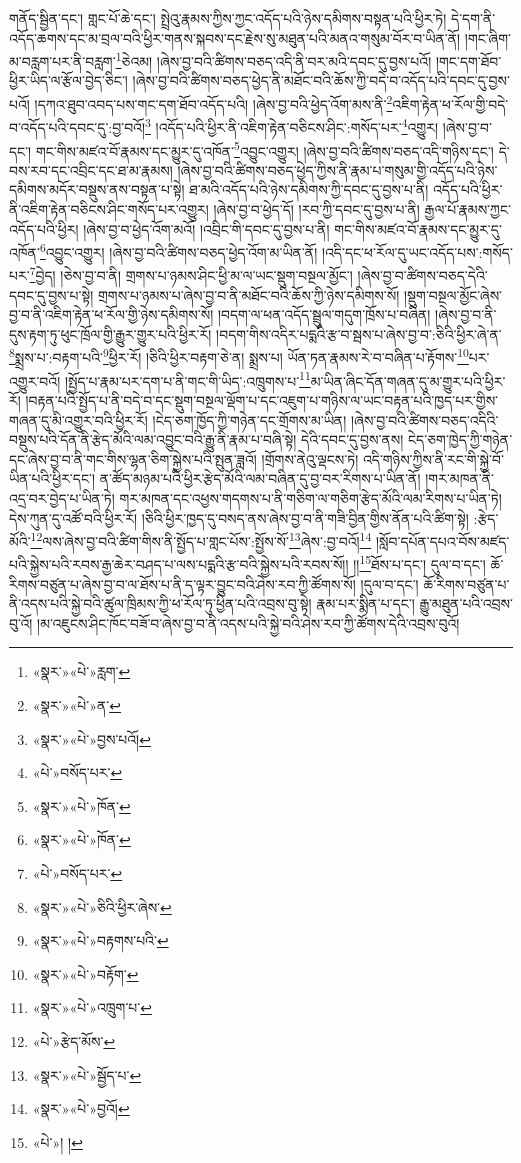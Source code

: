 གནོད་སྦྱིན་དང་། གླང་པོ་ཆེ་དང་། སྤྲེའུ་རྣམས་ཀྱིས་ཀྱང་འདོད་པའི་ཉེས་དམིགས་བསྟན་པའི་ཕྱིར་ཏེ། དེ་དག་ནི་འདོད་ཆགས་དང་མ་བྲལ་བའི་ཕྱིར་གནས་སྐབས་དང་རྗེས་སུ་མཐུན་པའི་མནའ་གསུམ་བོར་བ་ཡིན་ནོ། །གང་ཞིག་མ་བརླག་པར་ནི་བརླག་\footnote{«སྣར་»«པེ་»རླག་}ཅེའམ། །ཞེས་བྱ་བའི་ཚིགས་བཅད་འདི་ནི་བར་མའི་དབང་དུ་བྱས་པའོ། །གང་དག་ཐོབ་ཕྱིར་ཡིད་ལ་རྩོལ་བྱེད་ཅིང་། །ཞེས་བྱ་བའི་ཚིགས་བཅད་ཕྱེད་ནི་མཐོང་བའི་ཆོས་ཀྱི་བདེ་བ་འདོད་པའི་དབང་དུ་བྱས་པའོ། །དཀའ་ཐུབ་འབད་པས་གང་དག་ཐོབ་འདོད་པའི། །ཞེས་བྱ་བའི་ཕྱེད་འོག་མས་ནི་\footnote{«སྣར་»«པེ་»ན་}འཇིག་རྟེན་ཕ་རོལ་གྱི་བདེ་བ་འདོད་པའི་དབང་དུ་:བྱ་བའོ།\footnote{«སྣར་»«པེ་»བྱས་པའོ།} །འདོད་པའི་ཕྱིར་ནི་འཇིག་རྟེན་བཅིངས་ཤིང་:གསོད་པར་\footnote{«པེ་»བསོད་པར་}འགྱུར། །ཞེས་བྱ་བ་དང་། གང་གིས་མཛའ་བོ་རྣམས་དང་མྱུར་དུ་འཁོན་\footnote{«སྣར་»«པེ་»ཁོན་}འབྱུང་འགྱུར། །ཞེས་བྱ་བའི་ཚིགས་བཅད་འདི་གཉིས་དང་། དེ་བས་རབ་དང་འབྲིང་དང་ཐ་མ་རྣམས། །ཞེས་བྱ་བའི་ཚིགས་བཅད་ཕྱེད་ཀྱིས་ནི་རྣམ་པ་གསུམ་གྱི་འདོད་པའི་ཉེས་དམིགས་མདོར་བསྡུས་ནས་བསྟན་པ་སྟེ། ཐ་མའི་འདོད་པའི་ཉེས་དམིགས་ཀྱི་དབང་དུ་བྱས་པ་ནི། འདོད་པའི་ཕྱིར་ནི་འཇིག་རྟེན་བཅིངས་ཤིང་གསོད་པར་འགྱུར། །ཞེས་བྱ་བ་ཕྱེད་དོ། །རབ་ཀྱི་དབང་དུ་བྱས་པ་ནི། རྒྱལ་པོ་རྣམས་ཀྱང་འདོད་པའི་ཕྱིར། །ཞེས་བྱ་བ་ཕྱེད་འོག་མའོ། །འབྲིང་གི་དབང་དུ་བྱས་པ་ནི། གང་གིས་མཛའ་བོ་རྣམས་དང་མྱུར་དུ་འཁོན་\footnote{«སྣར་»«པེ་»ཁོན་}འབྱུང་འགྱུར། །ཞེས་བྱ་བའི་ཚིགས་བཅད་ཕྱེད་འོག་མ་ཡིན་ནོ། །འདི་དང་ཕ་རོལ་དུ་ཡང་འདོད་པས་:གསོད་པར་\footnote{«པེ་»བསོད་པར་}བྱེད། །ཅེས་བྱ་བ་ནི། གྲགས་པ་ཉམས་ཤིང་ཕྱི་མ་ལ་ཡང་སྡུག་བསྔལ་མྱོང་། །ཞེས་བྱ་བ་ཚིགས་བཅད་དེའི་དབང་དུ་བྱས་པ་སྟེ། གྲགས་པ་ཉམས་པ་ཞེས་བྱ་བ་ནི་མཐོང་བའི་ཆོས་ཀྱི་ཉེས་དམིགས་སོ། །སྡུག་བསྔལ་མྱོང་ཞེས་བྱ་བ་ནི་འཇིག་རྟེན་ཕ་རོལ་གྱི་ཉེས་དམིགས་སོ། །བདག་ལ་ཕན་འདོད་སྦྲུལ་གདུག་ཁྲོས་པ་བཞིན། །ཞེས་བྱ་བ་ནི་དུས་རྟག་ཏུ་ཕུང་ཁྲོལ་གྱི་རྒྱུར་གྱུར་པའི་ཕྱིར་རོ། །བདག་གིས་འདིར་པདྨའི་རྩ་བ་སྦས་པ་ཞེས་བྱ་བ་:ཅིའི་ཕྱིར་ཞེ་ན་\footnote{«སྣར་»«པེ་»ཅིའི་ཕྱིར་ཞེས་}སྨྲས་པ་:བརྟག་པའི་\footnote{«སྣར་»«པེ་»བརྟགས་པའི་}ཕྱིར་རོ། །ཅིའི་ཕྱིར་བརྟག་ཅེ་ན། སྨྲས་པ། ཡོན་ཏན་རྣམས་རེ་བ་བཞིན་པ་རྟོགས་\footnote{«སྣར་»«པེ་»བརྟོག་}པར་འགྱུར་བའོ། །སྤྱོད་པ་རྣམ་པར་དག་པ་ནི་གང་གི་ཡིད་:འཁྲུགས་པ་\footnote{«སྣར་»«པེ་»འཁྲུག་པ་}མ་ཡིན་ཞིང་དོན་གཞན་དུ་མ་གྱུར་པའི་ཕྱིར་རོ། །བརྟན་པའི་སྤྱོད་པ་ནི་བདེ་བ་དང་སྡུག་བསྔལ་ལྡོག་པ་དང་འཇུག་པ་གཉིས་ལ་ཡང་བརྟན་པའི་ཁྱད་པར་གྱིས་གཞན་དུ་མི་འགྱུར་བའི་ཕྱིར་རོ། །ངེད་ཅག་ཁྱོད་ཀྱི་གཉེན་དང་གྲོགས་མ་ཡིན། །ཞེས་བྱ་བའི་ཚིགས་བཅད་འདིའི་བསྡུས་པའི་དོན་ནི་རྩེད་མོའི་ལམ་འབྱུང་བའི་རྒྱུ་ནི་རྣམ་པ་བཞི་སྟེ། དེའི་དབང་དུ་བྱས་ནས། ངེད་ཅག་ཁྱེད་ཀྱི་གཉེན་དང་ཞེས་བྱ་བ་ནི་གང་གིས་ལྷན་ཅིག་སྐྱེས་པའི་སྤུན་ཟླའོ། །གྲོགས་ནེའུ་ལྡངས་ཏེ། འདི་གཉིས་ཀྱིས་ནི་རང་གི་སྐྱེ་བོ་ཡིན་པའི་ཕྱིར་དང་། ན་ཚོད་མཉམ་པའི་ཕྱིར་རྩེད་མོའི་ལམ་བཞིན་དུ་བྱ་བར་རིགས་པ་ཡིན་ནོ། །གར་མཁན་ནི་འདྲ་བར་བྱེད་པ་ཡིན་ཏེ། གར་མཁན་དང་འཕྱས་གདགས་པ་ནི་གཅིག་ལ་གཅིག་རྩེད་མོའི་ལམ་རིགས་པ་ཡིན་ཏེ། དེས་ཀུན་དུ་འཚོ་བའི་ཕྱིར་རོ། །ཅིའི་ཕྱིར་ཁྱད་དུ་བསད་ནས་ཞེས་བྱ་བ་ནི་གཟི་བྱིན་གྱིས་ནོན་པའི་ཚིག་སྟེ། :རྩེད་མོའི་\footnote{«པེ་»རྩེད་མོས་}ལས་ཞེས་བྱ་བའི་ཚིག་གིས་ནི་སྤྱོད་པ་གླང་པོས་:སྤྱོས་སོ་\footnote{«སྣར་»«པེ་»སྦྱོད་པ་}ཞེས་:བྱ་བའོ།\footnote{«སྣར་»«པེ་»བྱའོ།} །སློབ་དཔོན་དཔའ་བོས་མཛད་པའི་སྐྱེས་པའི་རབས་རྒྱ་ཆེར་བཤད་པ་ལས་པདྨའི་རྩ་བའི་སྐྱེས་པའི་རབས་སོ།། །།\footnote{«པེ་»། །}ཐོས་པ་དང་། དུལ་བ་དང་། ཆོ་རིགས་བཙུན་པ་ཞེས་བྱ་བ་ལ་ཐོས་པ་ནི་ད་ལྟར་བྱུང་བའི་ཤེས་རབ་ཀྱི་ཚོགས་སོ། །དུལ་བ་དང་། ཆོ་རིགས་བཙུན་པ་ནི་འདས་པའི་སྐྱེ་བའི་ཚུལ་ཁྲིམས་ཀྱི་ཕ་རོལ་ཏུ་ཕྱིན་པའི་འབྲས་བུ་སྟེ། རྣམ་པར་སྨིན་པ་དང་། རྒྱུ་མཐུན་པའི་འབྲས་བུ་འོ། །མ་འཇུངས་ཤིང་ཁོང་བཟོ་བ་ཞེས་བྱ་བ་ནི་འདས་པའི་སྐྱེ་བའི་ཤེས་རབ་ཀྱི་ཚོགས་དེའི་འབྲས་བུའོ། 